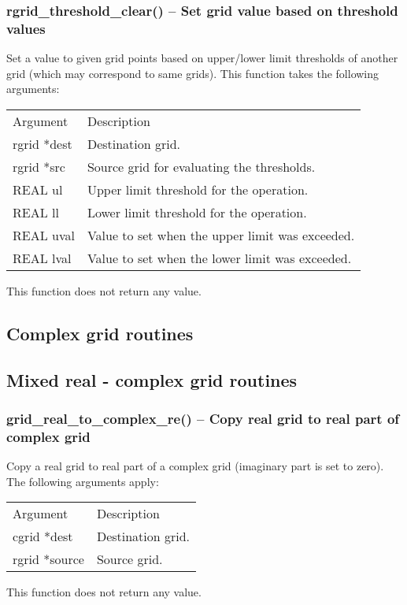 \documentclass[12pt,letterpaper]{article}
\begin{document}
\subsubsection{rgrid\_threshold\_clear() -- Set grid value based on threshold values}

Set a value to given grid points based on upper/lower limit thresholds of another grid (which may correspond to same grids). This function takes the following arguments:
\begin{longtable}{p{} p{}}
Argument & Description\\
\cline{1-2}
rgrid *dest & Destination grid.\\
rgrid *src  & Source grid for evaluating the thresholds.\\
REAL ul & Upper limit threshold for the operation.\\
REAL ll & Lower limit threshold for the operation.\\
REAL uval & Value to set when the upper limit was exceeded.\\
REAL lval & Value to set when the lower limit was exceeded.\\
\end{longtable}
\noindent
This function does not return any value. 

\subsection{Complex grid routines}

\subsection{Mixed real - complex grid routines}


\subsubsection{grid\_real\_to\_complex\_re() -- Copy real grid to real part of complex grid}

Copy a real grid to real part of a complex grid (imaginary part is set to zero). The following arguments apply:
\begin{longtable}{p{} p{}}
Argument & Description\\
\cline{1-2}
cgrid *dest & Destination grid.\\
rgrid *source & Source grid.\\
\end{longtable}
\noindent
This function does not return any value.
\end{document}
